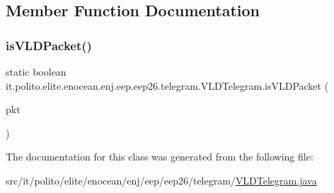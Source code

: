 \subsection{Member Function Documentation}
\hypertarget{classit_1_1polito_1_1elite_1_1enocean_1_1enj_1_1eep_1_1eep26_1_1telegram_1_1_v_l_d_telegram_aa53b4e6c52d31cc6d3ad0761436a52a8}{}\label{classit_1_1polito_1_1elite_1_1enocean_1_1enj_1_1eep_1_1eep26_1_1telegram_1_1_v_l_d_telegram_aa53b4e6c52d31cc6d3ad0761436a52a8} 
\subsubsection{\texorpdfstring{is\+V\+L\+D\+Packet()}{isVLDPacket()}}
{\footnotesize\ttfamily static boolean it.\+polito.\+elite.\+enocean.\+enj.\+eep.\+eep26.\+telegram.\+V\+L\+D\+Telegram.\+is\+V\+L\+D\+Packet (\begin{DoxyParamCaption}\item[{\hyperlink{classit_1_1polito_1_1elite_1_1enocean_1_1protocol_1_1serial_1_1v3_1_1network_1_1packet_1_1_e_s_p3_packet}{E\+S\+P3\+Packet}}]{pkt }\end{DoxyParamCaption})\hspace{0.3cm}{\ttfamily [static]}}



The documentation for this class was generated from the following file\+:\begin{DoxyCompactItemize}
\item 
src/it/polito/elite/enocean/enj/eep/eep26/telegram/\hyperlink{_v_l_d_telegram_8java}{V\+L\+D\+Telegram.\+java}\end{DoxyCompactItemize}
